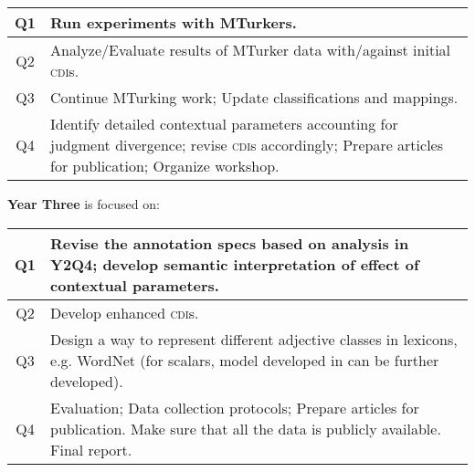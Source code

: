 \documentclass[10pt]{article}
\newcommand{\miniskip}{\vspace*{1mm}}
\begin{document}
\vspace{2mm}\noindent
{\small
\begin{tabularx}{470pt}{|c|X|}

\hline

Q1 	&  Run experiments with MTurkers. \\

\hline

Q2	& Analyze/Evaluate results of MTurker data with/against initial \textsc{cdi}s. \\

\hline

Q3	&  Continue MTurking work; Update classifications and mappings. \\

\hline

Q4	& Identify detailed contextual parameters accounting for judgment divergence; revise \textsc{cdi}s accordingly; Prepare articles for
     publication;  Organize workshop. \\
\hline

\end{tabularx}
}


\miniskip\noindent
{\bf Year Three} is focused on:  

\vspace{2mm}\noindent
{\small
\begin{tabularx}{470pt}{|c|X|}

\hline

Q1 & Revise the annotation specs based on analysis in Y2Q4; develop semantic interpretation of effect of contextual parameters. 
\\

\hline

Q2 & Develop enhanced \textsc{cdi}s.  \\

\hline

Q3 &   Design a way to represent different adjective classes in lexicons, e.g. WordNet (for scalars, model developed in \cite{sheinmanetal2013} can be further developed). \\

\hline

Q4 &  Evaluation; Data collection protocols; Prepare articles for publication. Make sure that all the data is publicly available. Final report.\\

\hline

\end{tabularx}
}
\end{document}
